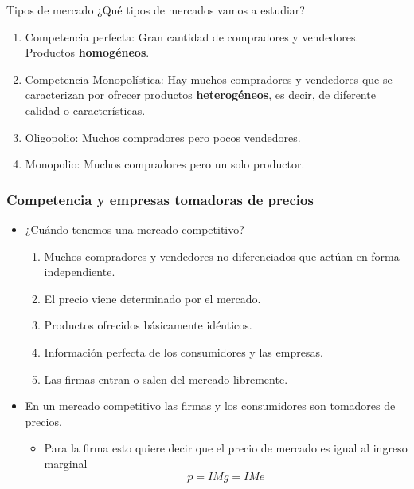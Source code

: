 \documentclass{beamer}
\begin{document}
\begin{frame}{Tipos de mercado}
    ¿Qué tipos de mercados vamos a estudiar?
    \begin{enumerate}
        \item Competencia perfecta: Gran cantidad de compradores y vendedores. Productos \textbf{homogéneos}.
        \item Competencia Monopolística: Hay muchos compradores
        y vendedores que se caracterizan por ofrecer productos \textbf{heterogéneos}, es decir, de diferente
        calidad o características.
        \item Oligopolio: Muchos compradores pero pocos vendedores.
        \item Monopolio: Muchos compradores pero un solo productor.
    \end{enumerate}
\end{frame}


\begin{frame}
\frametitle{Competencia y empresas tomadoras de precios}
\begin{itemize}
    \item ¿Cuándo tenemos una mercado competitivo?
    \begin{enumerate}
        \item Muchos compradores y vendedores no diferenciados que actúan en forma independiente.
        \item El precio viene determinado por el mercado.
        \item Productos ofrecidos básicamente idénticos.
        \item Información perfecta de los consumidores y las empresas.
        \item Las firmas entran o salen del mercado libremente.
    \end{enumerate}
    \vspace{2mm}
    \item En un mercado competitivo las firmas y los consumidores son tomadores de precios.
    \begin{itemize}
        \item Para la firma esto quiere decir que el precio de mercado es igual al ingreso marginal
        \[ p = IMg = IMe \]
    \end{itemize}
\end{itemize}
\end{frame}
\end{document}
